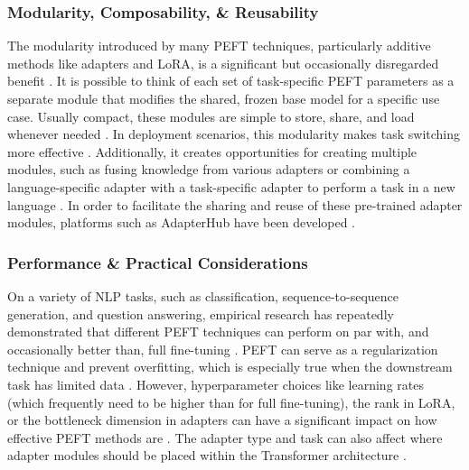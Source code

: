 \documentclass{DESSThesis}
\begin{document}
\subsubsection{Modularity, Composability, \& Reusability}
The modularity introduced by many PEFT techniques, particularly additive methods like adapters and LoRA, is a significant but occasionally disregarded benefit \cite{ruder_modular_2022,pfeiffer_modular_2024}. It is possible to think of each set of task-specific PEFT parameters as a separate module that modifies the shared, frozen base model for a specific use case. Usually compact, these modules are simple to store, share, and load whenever needed \cite{poth_adapters_2023,mao_survey_2025}. In deployment scenarios, this modularity makes task switching more effective \cite{hu_lora_2021}. Additionally, it creates opportunities for creating multiple modules, such as fusing knowledge from various adapters or combining a language-specific adapter with a task-specific adapter to perform a task in a new language \cite{pfeiffer_modular_2024,poth_adapters_2023}. In order to facilitate the sharing and reuse of these pre-trained adapter modules, platforms such as AdapterHub have been developed \cite{poth_adapters_2023,pfeiffer_modular_2024}.

\subsubsection{Performance \& Practical Considerations}
On a variety of NLP tasks, such as classification, sequence-to-sequence generation, and question answering, empirical research has repeatedly demonstrated that different PEFT techniques can perform on par with, and occasionally better than, full fine-tuning \cite{houlsby_parameter-efficient_2019,hu_lora_2021,poth_adapters_2023,su_unlocking_2024}. PEFT can serve as a regularization technique and prevent overfitting, which is especially true when the downstream task has limited data \cite{ruder_modular_2022,su_unlocking_2024}. However, hyperparameter choices like learning rates (which frequently need to be higher than for full fine-tuning), the rank in LoRA, or the bottleneck dimension in adapters can have a significant impact on how effective PEFT methods are \cite{lialin_scaling_2023,biderman_lora_2024}. The adapter type and task can also affect where adapter modules should be placed within the Transformer architecture \cite{hu_llm-adapters_2023}.
\end{document}
